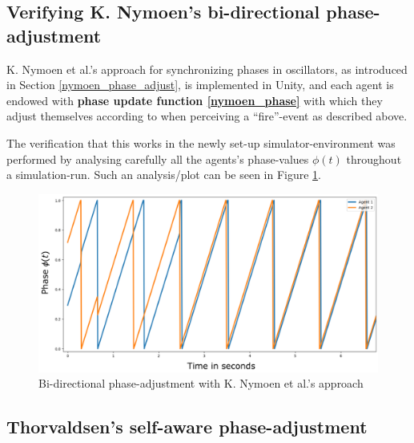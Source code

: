 	
	
	\subsection{Verifying K. Nymoen's bi-directional phase-adjustment} %
	
	K. Nymoen et al.'s approach for synchronizing phases in oscillators, as introduced in Section \ref{nymoen_phase_adjust}, is implemented in Unity, and each agent is endowed with \textbf{phase update function \eqref{nymoen_phase}} with which they adjust themselves according to when perceiving a ``fire''-event as described above.
	
	The verification that this works in the newly set-up simulator-environment was performed by analysing carefully all the agents's phase-values $\phi(t)$ throughout a simulation-run. Such an analysis/plot can be seen in Figure \ref{fig:nymoen_phase}.
	
	\begin{figure}[h]
		\centering
		\includegraphics[width=0.9\linewidth]{Assets/DocSegments/Chapters/Implementation/Figures/Illustrations/KNymoenPhaseAdjustmentSecondTry.pdf}
		\caption[Illustration of K. Nymoen's bi-directional phase-adjustment]{Bi-directional phase-adjustment with K. Nymoen et al.'s approach}
		\label{fig:nymoen_phase}
	\end{figure}
	
	
	

	\subsection{Thorvaldsen's self-aware phase-adjustment}
	
